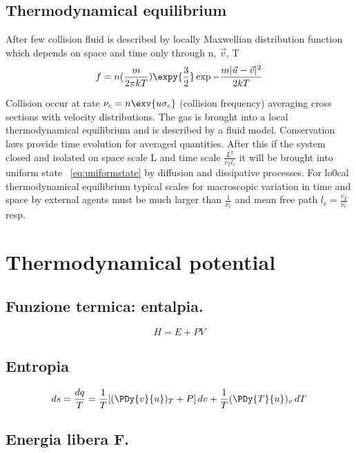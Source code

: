 \subsection{Thermodynamical equilibrium}

After few collision fluid is described by locally Maxwellian distribution function which depends on space and time only through n, $\vec{v}$, T
\begin{equation*}
f=n(\frac{m}{2\pi kT})\expy{\frac{3}{2}}\exp{-\frac{m|\vec{u}-\vec{v}|^2}{2kT}}
\end{equation*}

Collision occur at rate $\nu_c=n\exv{u\sigma_c}$ (collision frequency) averaging cross sections with velocity distributions. The gas is brought into a local thermodynamical equilibrium and is described by a fluid model. Conservation laws provide time evolution for averaged quantities. After this if the system closed and isolated on space scale L and time scale $\frac{L^2}{v_Tl_c}$ it will be brought into uniform state ~\ref{eq:uniformstate} by diffusion and dissipative processes. For lo0cal thermodynamical equilibrium typical scales for macroscopic variation in time and space by external agents must be much larger than $\frac{1}{\nu_c}$ and mean free path $l_c=\frac{v_T}{\nu_c}$ resp.

\section{Thermodynamical potential}

\subsection{Funzione termica: entalpia.}

\begin{equation*}
H=E+PV
\end{equation*}

\subsection{Entropia}

\begin{align*}
ds=\frac{dq}{T}=\frac{1}{T}[(\PDy{v}{u})_T+P]\,dv+\frac{1}{T}(\PDy{T}{u})_v\,dT
\end{align*}

\subsection{Energia libera F.}


